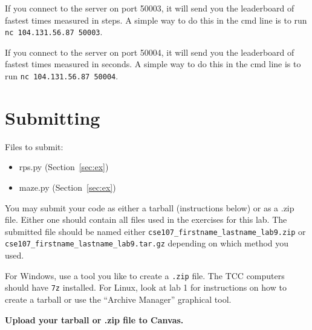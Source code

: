 \documentclass[11pt]{cselabheader}
\begin{document}
\begin{description}
  If you connect to the server on port 50003, it will send you the leaderboard of fastest times
  measured in steps. A simple way to do this in the cmd line is to run
  \lstinline{nc 104.131.56.87 50003}.

  If you connect to the server on port 50004, it will send you the leaderboard of fastest times
  measured in seconds. A simple way to do this in the cmd line is to run
  \lstinline{nc 104.131.56.87 50004}.
  
\end{description}

\pagebreak
\section{Submitting}

Files to submit:
\begin{itemize}
\item rps.py (Section~\ref{sec:ex})
\item maze.py (Section~\ref{sec:ex})
\end{itemize}

You may submit your code as either a tarball (instructions below) or as a .zip
file. Either one should contain all files used in the exercises for this lab.
The submitted file should be named either
\texttt{cse107\_firstname\_lastname\_lab9.zip} or
\texttt{cse107\_firstname\_lastname\_lab9.tar.gz} depending on which method you
used.

For Windows, use a tool you like to create a \texttt{.zip} file. The TCC
computers should have \texttt{7z} installed. For Linux, look at lab 1 for
instructions on how to create a tarball or use the ``Archive Manager'' graphical
tool.

\begin{center}
  \textbf{Upload your tarball or .zip file to Canvas.}
\end{center}
\end{document}
